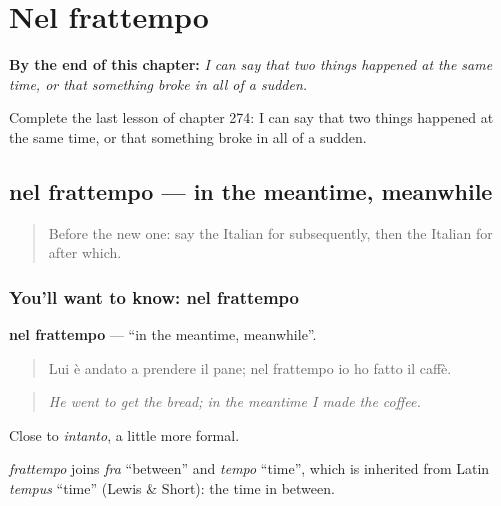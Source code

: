 
\chapter{Nel frattempo}
\label{ch:it-nel-frattempo}

\begin{chapteropening}
\textbf{By the end of this chapter:} \emph{I can say that two things happened at the same time, or that something broke in all of a sudden.}

Complete the last lesson of chapter 274: I can say that two things happened at the same time, or that something broke in all of a sudden.
\end{chapteropening}

\section[nel frattempo]{nel frattempo — in the meantime, meanwhile}

\label{lesson:IT-C274-nel-frattempo}



\begin{quote}
Before the new one: say the Italian for subsequently, then the Italian for after which.
\end{quote}

\subsection*{You'll want to know: nel frattempo}
\textbf{nel frattempo} — \textquotedblleft{}in the meantime, meanwhile\textquotedblright{}.

\begin{quote}
Lui è andato a prendere il pane; nel frattempo io ho fatto il caffè.
\end{quote}

\begin{quote}
\emph{He went to get the bread; in the meantime I made the coffee.}
\end{quote}

Close to \emph{intanto}, a little more formal.

\begin{cousinweb}
\emph{frattempo} joins \emph{fra} \textquotedblleft{}between\textquotedblright{} and \emph{tempo} \textquotedblleft{}time\textquotedblright{}, which is inherited from Latin \emph{tempus} \textquotedblleft{}time\textquotedblright{} (Lewis \& Short): the time in between.
\end{cousinweb}

